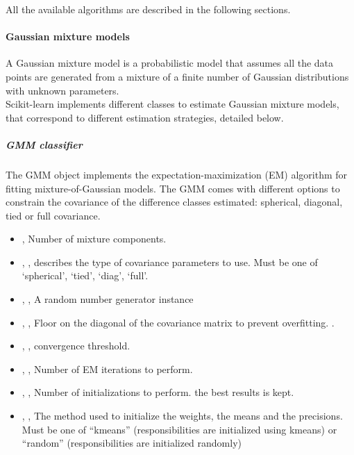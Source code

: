 All the available algorithms are described in the following sections.

\paragraph{Gaussian mixture models}
\label{paragraph:GMM}

A Gaussian mixture model is a probabilistic model that assumes all
 the data points are generated from a mixture of a finite number of
 Gaussian distributions with unknown parameters.
\\
Scikit-learn implements different classes to estimate Gaussian
mixture models, that correspond to different estimation strategies,
 detailed below.

\subparagraph{ GMM classifier} \hfill
\label{subparagraph:GMMClass}

The GMM object implements the expectation-maximization (EM)
algorithm for fitting mixture-of-Gaussian models. The GMM comes with different options
 to constrain the covariance of  the difference classes estimated: spherical, diagonal, tied or
 full covariance.

\begin{itemize}
	\item {},  Number of mixture components. 
	\item {}, , describes the type of covariance parameters to use.
Must be one of ‘spherical’, ‘tied’, ‘diag’, ‘full’. 
	\item {}, ,  A random number
generator instance 
	\item {}, ,
 Floor on the diagonal of the covariance matrix to prevent overfitting.
 .
	\item {}, ,
convergence threshold. 
	\item {}, ,
Number of EM iterations to perform. 
	\item {}, ,
Number of initializations to perform. the best results is kept.
	\item {}, ,  The method used to initialize the weights, the means and the precisions. Must be one of 
 ``kmeans'' (responsibilities are initialized using kmeans) or ``random'' (responsibilities are 
 initialized randomly)
\end{itemize}

